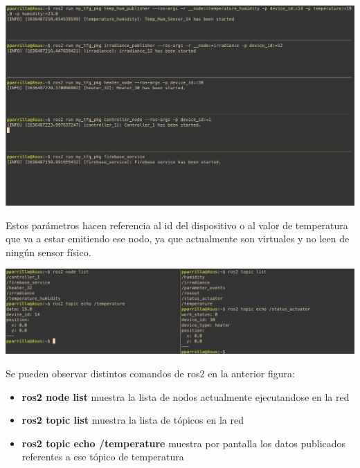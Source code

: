 \begin{center}
    \centering
    \includegraphics[width=\textwidth]{img/06-Ejecucion-nodos.png}
    \label{fig:ejecucion-nodos}
\end{center}

Estos parámetros hacen referencia al id del dispositivo o al valor de temperatura que va a estar emitiendo ese nodo, ya que actualmente son virtuales y no leen de ningún sensor físico.

 \begin{center}
    \centering
    \includegraphics[width=\textwidth]{img/06-Tools.png}
    \label{fig:tools-ros2}
\end{center}

Se pueden observar distintos comandos de ros2 en la anterior figura:

\begin{itemize}
    \item \textbf{ros2 node list} muestra la lista de nodos actualmente ejecutandose en la red
    \item \textbf{ros2 topic list} muestra la lista de tópicos en la red
    \item \textbf{ros2 topic echo /temperature} muestra por pantalla los datos publicados referentes a ese tópico de temperatura
\end{itemize}


